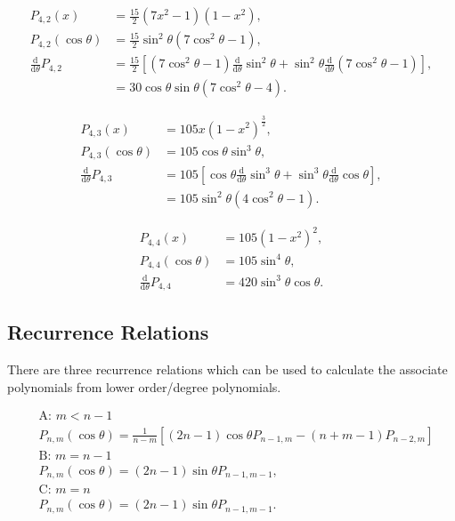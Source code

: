 \documentclass[]{article}
\begin{document}
	\begin{align}
		P_{4,2} (x) &= \frac{15}{2}(7x^2 - 1) (1-x^2), \\
		P_{4,2} (\cos{\theta}) &= \frac{15}{2} \sin^2{\theta}(7\cos^2{\theta} - 1), \\
		\frac{\text{d}}{\text{d} \theta} P_{4,2} &= \frac{15}{2}\left[(7\cos^2{\theta} - 1)\frac{\text{d}}{\text{d}\theta}\sin^2{\theta} + \sin^2{\theta} \frac{\text{d}}{\text{d}\theta}(7\cos^2{\theta} - 1)\right], \\
		&= 30\cos{\theta}\sin{\theta}(7\cos^2{\theta} - 4).
	\end{align}

	\begin{align}
		P_{4,3} (x) &= 105x(1-x^2)^\frac{3}{2}, \\
		P_{4,3} (\cos{\theta}) &= 105 \cos{\theta}\sin^3{\theta}, \\
		\frac{\text{d}}{\text{d} \theta} P_{4,3} &= 105\left[\cos{\theta}\frac{\text{d}}{\text{d}\theta}\sin^3{\theta} + \sin^3{\theta}\frac{\text{d}}{\text{d}\theta}\cos{\theta}\right], \\
		&= 105 \sin^2{\theta}(4\cos^2{\theta} - 1).
	\end{align}	

	\begin{align}
		P_{4,4} (x) &= 105(1-x^2)^2, \\
		P_{4,4} (\cos{\theta}) &= 105 \sin^4{\theta}, \\
		\frac{\text{d}}{\text{d} \theta} P_{4,4} &= 420 \sin^3{\theta} \cos{\theta}.
	\end{align}	
	
	\subsection{Recurrence Relations}
	
		There are three recurrence relations which can be used to calculate the associate polynomials from lower order/degree polynomials.
		
		\begin{align}
			&\text{A: }  m < n-1  \nonumber \\ 
			&P_{n,m} (\cos{\theta}) = \frac{1}{n-m} \left[(2n-1)\cos{\theta} P_{n-1,m} - (n + m -1)P_{n-2,m}\right] \\
			&\text{B: }  m = n-1  \nonumber \\ 
			&P_{n,m} (\cos{\theta}) = (2n-1)\sin{\theta} P_{n-1,m-1}, \\
			&\text{C: }  m = n  \nonumber \\ 
			&P_{n,m} (\cos{\theta}) = (2n-1)\sin{\theta} P_{n-1,m-1}.
		\end{align}
		
\end{document}
